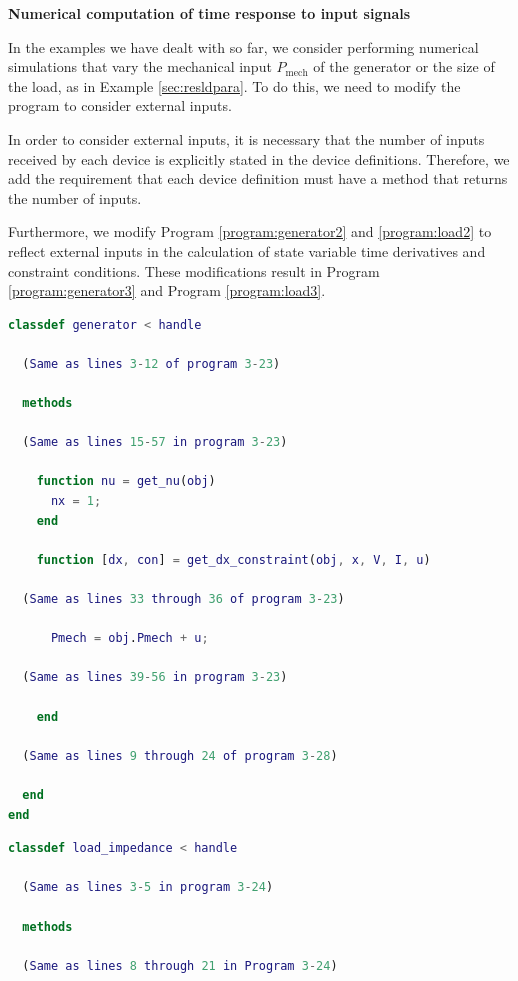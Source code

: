 \documentclass[graybox, envcountchap]{svmult}
\begin{document}
\begin{example}{\textbf{Numerical computation of time response to input signals}}

In the examples we have dealt with so far, we consider performing numerical
simulations that vary the mechanical input $P_\mathrm{mech}$ of the generator or
the size of the load, as in Example \ref{sec:resldpara}. To do this, we need to
modify the program to consider external inputs.

In order to consider external inputs, it is necessary that the number of inputs
received by each device is explicitly stated in the device definitions.
Therefore, we add the requirement that each device definition must have a method
that returns the number of inputs.

Furthermore, we modify Program \ref{program:generator2} and \ref{program:load2}
to reflect external inputs in the calculation of state variable time derivatives
and constraint conditions. These modifications result in Program
\ref{program:generator3} and Program \ref{program:load3}.

\begin{lstlisting}[language=Matlab, caption=generator.m, label={program:generator3}]
classdef generator < handle
  
  (Same as lines 3-12 of program 3-23)

  methods

  (Same as lines 15-57 in program 3-23)

    function nu = get_nu(obj)
      nx = 1;
    end

    function [dx, con] = get_dx_constraint(obj, x, V, I, u)
      
  (Same as lines 33 through 36 of program 3-23)

      Pmech = obj.Pmech + u;

  (Same as lines 39-56 in program 3-23)

    end

  (Same as lines 9 through 24 of program 3-28)

  end
end
\end{lstlisting}


\begin{lstlisting}[language=Matlab, caption=load\_impedance.m, label={program:load3}]
classdef load_impedance < handle
  
  (Same as lines 3-5 in program 3-24)

  methods

  (Same as lines 8 through 21 in Program 3-24)
    

\end{lstlisting}
\end{example}
\end{document}
